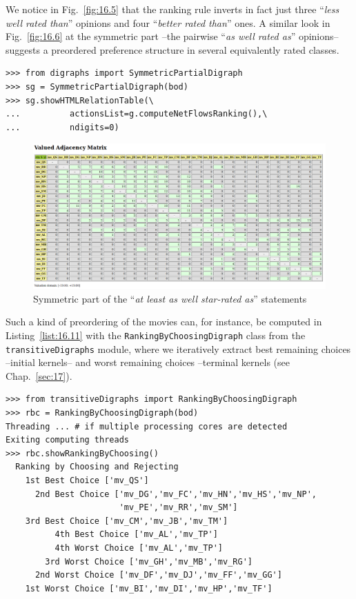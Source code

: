 We notice in Fig.~\vref{fig:16.5} that the \NetFlows ranking rule inverts in fact just three ``\emph{less well rated than}'' opinions and four ``\emph{better rated than}'' ones. A similar look in Fig.~\vref{fig:16.6} at the symmetric part --the pairwise ``\emph{as well rated as}'' opinions-- suggests a preordered preference structure in several equivalently rated classes. 
\begin{lstlisting}
>>> from digraphs import SymmetricPartialDigraph
>>> sg = SymmetricPartialDigraph(bod)
>>> sg.showHTMLRelationTable(\
...          actionsList=g.computeNetFlowsRanking(),\
...          ndigits=0)
\end{lstlisting}
\begin{figure}[ht]
\includegraphics[width=\hsize]{Figures/16-6-symmetricPart.png}
\caption{Symmetric part of the ``\emph{at least as well star-rated as}'' statements}
\label{fig:16.6}       %
\end{figure}

Such a kind of preordering of the movies can, for instance, be computed in Listing~\vref{list:16.11} with the \texttt{RankingByChoosingDigraph} class from the \texttt{transitiveDigraphs} module, where we iteratively extract best remaining choices --initial kernels-- and worst remaining choices --terminal kernels (see Chap.~\ref{sec:17}).
\begin{lstlisting}[caption={Bipolar ranking-by-choosing the movies},label=list:16.11]
>>> from transitiveDigraphs import RankingByChoosingDigraph
>>> rbc = RankingByChoosingDigraph(bod)
Threading ... # if multiple processing cores are detected
Exiting computing threads
>>> rbc.showRankingByChoosing()
  Ranking by Choosing and Rejecting
    1st Best Choice ['mv_QS']
      2nd Best Choice ['mv_DG','mv_FC','mv_HN','mv_HS','mv_NP',
                       'mv_PE','mv_RR','mv_SM']
	3rd Best Choice ['mv_CM','mv_JB','mv_TM']
          4th Best Choice ['mv_AL','mv_TP']
          4th Worst Choice ['mv_AL','mv_TP']
        3rd Worst Choice ['mv_GH','mv_MB','mv_RG']
      2nd Worst Choice ['mv_DF','mv_DJ','mv_FF','mv_GG']
    1st Worst Choice ['mv_BI','mv_DI','mv_HP','mv_TF']
\end{lstlisting}

